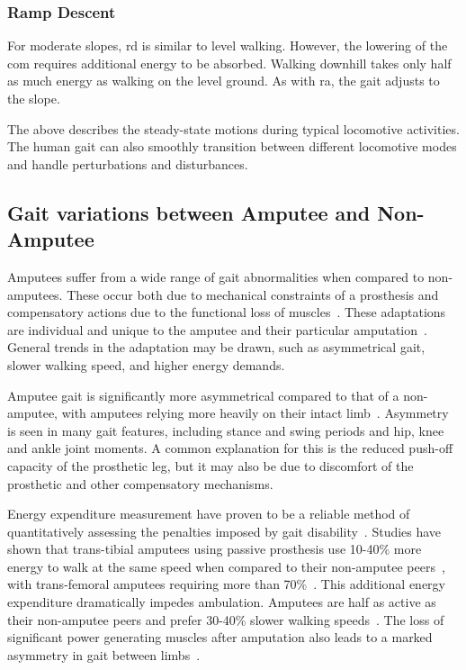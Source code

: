 \subsubsection{Ramp Descent}
For moderate slopes, \acrshort{rd} is similar to level walking. However, the lowering of the \acrshort{com} requires additional energy to be absorbed\cite{Franz2012a}. Walking downhill takes only half as much energy as walking on the level ground\cite{Matsumoto2017}. As with \acrshort{ra}, the gait adjusts to the slope.

The above describes the steady-state motions during typical locomotive activities. The human gait can also smoothly transition between different locomotive modes and handle perturbations and disturbances.\cite{Li2019}

\subsection{Gait variations between Amputee and Non-Amputee}
Amputees suffer from a wide range of gait abnormalities when compared to non-amputees. These occur both due to mechanical constraints of a prosthesis and compensatory actions due to the functional loss of muscles~\cite{Rabuffetti2005, Silverman2008}. These adaptations are individual and unique to the amputee and their particular amputation~\cite{Lechler2018, Kovac2009}. General trends in the adaptation may be drawn, such as asymmetrical gait, slower walking speed, and higher energy demands\cite{Burkett2004}.

Amputee gait is significantly more asymmetrical compared to that of a non-amputee, with amputees relying more heavily on their intact limb~\cite{Bateni2002, Varrecchia2019}. Asymmetry is seen in many gait features, including stance and swing periods and hip, knee and ankle joint moments\cite{Adamczyk2015, Harandi2020}. A common explanation for this is the reduced push-off capacity of the prosthetic leg, but it may also be due to discomfort of the prosthetic and other compensatory mechanisms\cite{Hak2014}.

Energy expenditure measurement have proven to be a reliable method of quantitatively assessing the penalties imposed by gait disability~\cite{Waters1999}. Studies have shown that trans-tibial amputees using passive prosthesis use 10-40\% more energy to walk at the same speed when compared to their non-amputee peers~\cite{McDonald2018, Herr2012}, with trans-femoral amputees requiring more than 70\%~\cite{Stewart2008}. This additional energy expenditure dramatically impedes ambulation. Amputees are half as active as their non-amputee peers and prefer 30-40\% slower walking speeds~\cite{Bussmann2008, Piazza2017, Lin2014, Au2009}. The loss of significant power generating muscles after amputation also leads to a marked asymmetry in gait between limbs~\cite{Button2010}.

